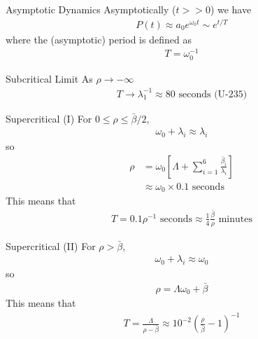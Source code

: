 \documentclass[presentation]{beamer}
\begin{document}
\begin{frame}[label={sec:orgheadline4}]{Asymptotic Dynamics}
Asymptotically (\(t >> 0\)) we have
\begin{align*}
  P(t) \approx a_0 e^{\omega_0 t} \sim e^{t/T}
\end{align*}
where the (asymptotic) period is defined as
\begin{align*}
  T = \omega_0^{-1}
\end{align*}
\end{frame}
\begin{frame}[label={sec:orgheadline5}]{Subcritical Limit}
As \(\rho \rightarrow -\infty\)
\begin{align*}
  T \rightarrow \lambda_1^{-1} \approx 80 \text{ seconds (U-235)}
\end{align*}
\end{frame}
\begin{frame}[label={sec:orgheadline6}]{Supercritical (I)}
For \(0 \leq \rho \leq \bar{\beta}/2\),
\begin{align*}
  \omega_0 + \lambda_i \approx \lambda_i
\end{align*}
\pause
so
\begin{align*}
  \rho &=  \omega_0 \left[\Lambda + \sum_{i=1}^6 \frac{\bar{\beta}_i}{\lambda_i} \right] \\
       &\approx \omega_0 \times 0.1 \text{ seconds}
\end{align*}
\pause
This means that
\begin{align*}
  T = 0.1 \rho^{-1} \text{ seconds} \approx \frac{1}{4} \frac{\bar{\beta}}{\rho} \text{ minutes}
\end{align*}
\end{frame}
\begin{frame}[label={sec:orgheadline7}]{Supercritical (II)}
For \(\rho > \bar{\beta}\),
\begin{align*}
  \omega_0 + \lambda_i \approx \omega_0
\end{align*}
\pause
so
\begin{align*}
  \rho = \Lambda \omega_0 + \bar{\beta}
\end{align*}
\pause
This means that
\begin{align*}
  T = \frac{\Lambda}{\rho-\bar{\beta}} \approx 10^{-2} \left(\frac{\rho}{\bar{\beta}}-1\right)^{-1}
\end{align*}
\end{frame}
\end{document}
